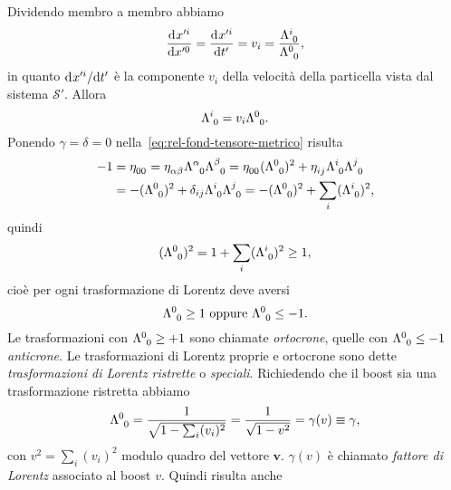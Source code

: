 Dividendo membro a membro abbiamo
\begin{equation}
  \toder{x'^{i}}{x'^{0}} = \toder{x'^{i}}{t'} = v_{i} =
  \frac{\tensor{\Lambda}{^{i}_{0}}}{\tensor{\Lambda}{^{0}_{0}}},
\end{equation}
in quanto $\mathrm{d}^{}x'^{i} / \mathrm{d} {t'}^{}$ è la componente $v_{i}$ della velocità della
particella vista dal sistema $\mathcal{S}'$.  Allora
\begin{equation}
  \tensor{\Lambda}{^{i}_{0}} = v_{i}\tensor{\Lambda}{^{0}_{0}}.
\end{equation}
Ponendo $\gamma = \delta = 0$ nella~\eqref{eq:rel-fond-tensore-metrico} risulta
\begin{equation}
  \begin{split}
    -1 &= \tensor{\eta}{_{00}} = \tensor{\eta}{_{\alpha\beta}}
    \tensor{\Lambda}{^{\alpha}_{0}} \tensor{\Lambda}{^{\beta}_{0}} =
    \tensor{\eta}{_{00}}(\tensor{\Lambda}{^{0}_{0}})^{2} + \tensor{\eta}{_{ij}}
    \tensor{\Lambda}{^{i}_{0}} \tensor{\Lambda}{^{j}_{0}}
    \\
    &= -(\tensor{\Lambda}{^{0}_{0}})^{2} + \delta_{ij}
    \tensor{\Lambda}{^{i}_{0}} \tensor{\Lambda}{^{j}_{0}} =
    -(\tensor{\Lambda}{^{0}_{0}})^{2}+\sum_{i}(\tensor{\Lambda}{^{i}_{0}})^{2},
  \end{split}
\end{equation}
quindi
\begin{equation}
  (\tensor{\Lambda}{^{0}_{0}})^{2} = 1 +
  \sum_{i}(\tensor{\Lambda}{^{i}_{0}})^{2} \geq 1,
\end{equation}
cioè per ogni trasformazione di Lorentz deve aversi
\begin{equation}
  \tensor{\Lambda}{^{0}_{0}} \geq 1 \text{ oppure } \tensor{\Lambda}{^{0}_{0}}
  \leq -1.
\end{equation}
Le trasformazioni con $\tensor{\Lambda}{^{0}_{0}} \geq +1$ sono chiamate
\emph{ortocrone}, quelle con $\tensor{\Lambda}{^{0}_{0}} \leq -1$
\emph{anticrone}.  Le trasformazioni di Lorentz proprie e ortocrone sono dette
\emph{trasformazioni di Lorentz ristrette} o \emph{speciali}.  Richiedendo che
il boost sia una trasformazione ristretta abbiamo
\begin{equation}
  \tensor{\Lambda}{^{0}_{0}} = \frac{1}{\sqrt{1-\sum_{i}(v_{i})^{2}}} =
  \frac{1}{\sqrt{1-v^{2}}} = \gamma(v) \equiv \gamma,
\end{equation}
con $v^{2} = \sum_{i}(v_{i})^{2}$ modulo quadro del vettore $\bm{v}$.
$\gamma(v)$ è chiamato \emph{fattore di Lorentz}
associato al boost $v$.  Quindi risulta anche
